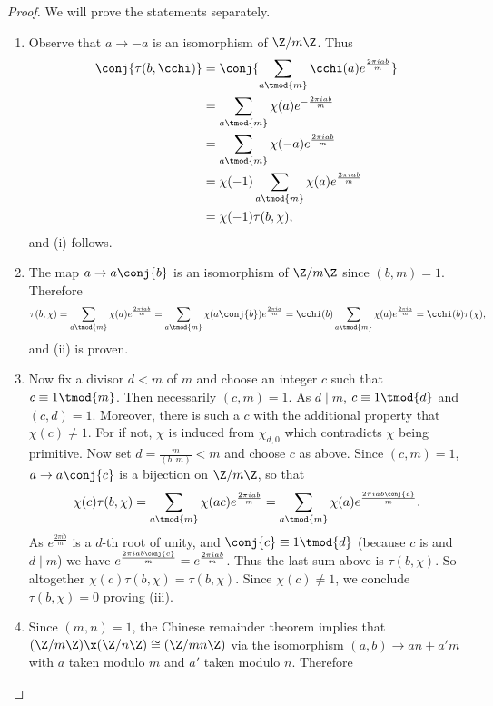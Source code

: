         \begin{proof}
          We will prove the statements separately.
          \begin{enumerate}[label=(\roman*)]
            \item Observe that $a \to -a$ is an isomorphism of $\Z/m\Z$. Thus
            \begin{align*}
              \conj{\tau(b,\cchi)} &= \conj{\sum_{a \tmod{m}}\cchi(a)e^{\frac{2\pi iab}{m}}} \\
              &= \sum_{a \tmod{m}}\chi(a)e^{-\frac{2\pi iab}{m}} \\
              &= \sum_{a \tmod{m}}\chi(-a)e^{\frac{2\pi iab}{m}} \\
              &= \chi(-1)\sum_{a \tmod{m}}\chi(a)e^{\frac{2\pi iab}{m}} \\
              &= \chi(-1)\tau(b,\chi),
            \end{align*}
            and (i) follows.
            \item The map $a \to a\conj{b}$ is an isomorphism of $\Z/m\Z$ since $(b,m) = 1$. Therefore
            \[
              \tau(b,\chi) = \sum_{a \tmod{m}}\chi(a)e^{\frac{2\pi iab}{m}} = \sum_{a \tmod{m}}\chi(a\conj{b})e^{\frac{2\pi ia}{m}} = \cchi(b)\sum_{a \tmod{m}}\chi(a)e^{\frac{2\pi ia}{m}} = \cchi(b)\tau(\chi),
            \]
            and (ii) is proven.
            \item Now fix a divisor $d < m$ of $m$ and choose an integer $c$ such that $c \equiv 1 \tmod{m}$. Then necessarily $(c,m) = 1$. As $d \mid m$, $c \equiv 1 \tmod{d}$ and $(c,d) = 1$. Moreover, there is such a $c$ with the additional property that $\chi(c) \neq 1$. For if not, $\chi$ is induced from $\chi_{d,0}$ which contradicts $\chi$ being primitive. Now set $d = \frac{m}{(b,m)} < m$ and choose $c$ as above. Since $(c,m) = 1$, $a \to a\conj{c}$ is a bijection on $\Z/m\Z$, so that
            \[
              \chi(c)\tau(b,\chi) = \sum_{a \tmod{m}}\chi(ac)e^{\frac{2\pi iab}{m}} = \sum_{a \tmod{m}}\chi(a)e^{\frac{2\pi iab\conj{c}}{m}}.
            \]
            As $e^{\frac{2\pi ib}{m}}$ is a $d$-th root of unity, and $\conj{c} \equiv 1 \tmod{d}$ (because $c$ is and $d \mid m$) we have $e^{\frac{2\pi iab\conj{c}}{m}} = e^{\frac{2\pi iab}{m}}$. Thus the last sum above is $\tau(b,\chi)$. So altogether $\chi(c)\tau(b,\chi) = \tau(b,\chi)$. Since $\chi(c) \neq 1$, we conclude $\tau(b,\chi) = 0$ proving (iii).
            \item Since $(m,n) = 1$, the Chinese remainder theorem implies that $(\Z/m\Z) \x (\Z/n\Z) \cong (\Z/mn\Z)$ via the isomorphism $(a,b) \to an+a'm$ with $a$ taken modulo $m$ and $a'$ taken modulo $n$. Therefore

\end{enumerate}
\end{proof}
